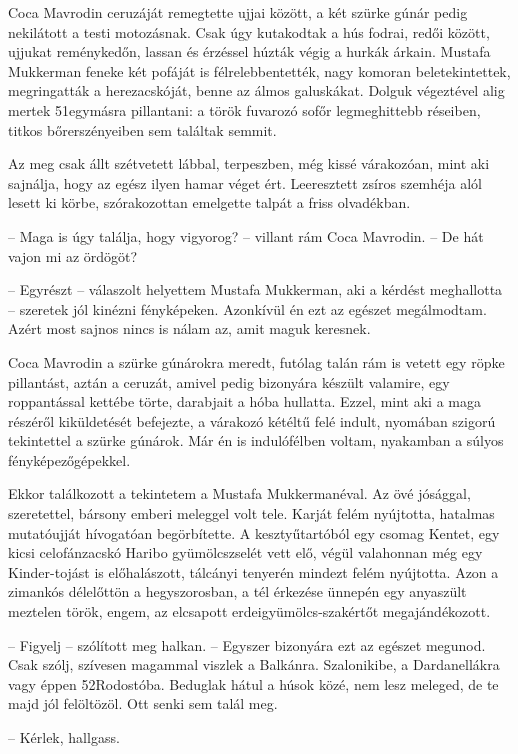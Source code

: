 \documentclass{IEEEtran}
\begin{document}
Coca Mavrodin ceruzáját remegtette ujjai között, a két szürke gúnár pedig
nekilátott a testi motozásnak. Csak úgy kutakodtak a hús fodrai, redői között,
ujjukat reménykedőn, lassan és érzéssel húzták végig a hurkák árkain. Mustafa
Mukkerman feneke két pofáját is félrelebbentették, nagy komoran
beletekintettek, megringatták a herezacskóját, benne az álmos galuskákat.
Dolguk végeztével alig mertek 51egymásra pillantani: a török fuvarozó sofőr
legmeghittebb réseiben, titkos bőrerszényeiben sem találtak semmit.

Az meg csak állt szétvetett lábbal, terpeszben, még kissé várakozóan, mint aki
sajnálja, hogy az egész ilyen hamar véget ért. Leeresztett zsíros szemhéja
alól lesett ki körbe, szórakozottan emelgette talpát a friss olvadékban.

– Maga is úgy találja, hogy vigyorog? – villant rám Coca Mavrodin. – De hát
vajon mi az ördögöt?

– Egyrészt – válaszolt helyettem Mustafa Mukkerman, aki a kérdést meghallotta
– szeretek jól kinézni fényképeken. Azonkívül én ezt az egészet megálmodtam.
Azért most sajnos nincs is nálam az, amit maguk keresnek.

Coca Mavrodin a szürke gúnárokra meredt, futólag talán rám is vetett egy röpke
pillantást, aztán a ceruzát, amivel pedig bizonyára készült valamire, egy
roppantással kettébe törte, darabjait a hóba hullatta. Ezzel, mint aki a maga
részéről kiküldetését befejezte, a várakozó kétéltű felé indult, nyomában
szigorú tekintettel a szürke gúnárok. Már én is indulófélben voltam, nyakamban
a súlyos fényképezőgépekkel.

Ekkor találkozott a tekintetem a Mustafa Mukkermanéval. Az övé jósággal,
szeretettel, bársony emberi meleggel volt tele. Karját felém nyújtotta,
hatalmas mutatóujját hívogatóan begörbítette. A kesztyűtartóból egy csomag
Kentet, egy kicsi celofánzacskó Haribo gyümölcszselét vett elő, végül
valahonnan még egy Kinder-tojást is előhalászott, tálcányi tenyerén mindezt
felém nyújtotta. Azon a zimankós délelőttön a hegyszorosban, a tél érkezése
ünnepén egy anyaszült meztelen török, engem, az elcsapott
erdeigyümölcs-szakértőt megajándékozott.

– Figyelj – szólított meg halkan. – Egyszer bizonyára ezt az egészet megunod.
Csak szólj, szívesen magammal viszlek a Balkánra. Szalonikibe, a Dardanellákra
vagy éppen 52Rodostóba. Beduglak hátul a húsok közé, nem lesz meleged, de te
majd jól felöltözöl. Ott senki sem talál meg.

– Kérlek, hallgass.
\end{document}
